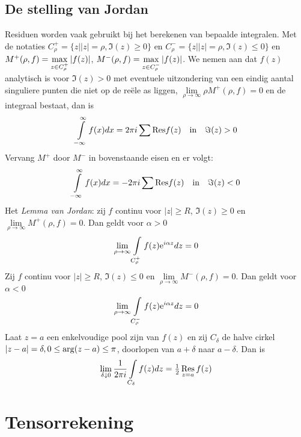 \section{De stelling van Jordan}
Residuen worden vaak gebruikt bij het berekenen van bepaalde integralen. Met de
notaties $C_\rho^+=\{z||z|=\rho,\Im(z)\geq0\}$ en $C_\rho^-=\{z||z|=\rho,\Im(z)\leq0\}$
en $M^+(\rho,f)=\mathop{\rm max}\limits_{z\in C_\rho^+}|f(z)|$,
$M^-(\rho,f)=\mathop{\rm max}\limits_{z\in C_\rho^-}|f(z)|$. We nemen aan dat
$f(z)$ analytisch is voor $\Im(z)>0$ met eventuele uitzondering van een eindig
aantal singuliere punten die niet op de re\"ele as liggen,
$\lim\limits_{\rho\rightarrow\infty}\rho M^+(\rho,f)=0$ en de integraal bestaat,
dan is
\[
\int\limits_{-\infty}^\infty f(x)dx=2\pi i\sum{\rm Res}f(z)~~~\mbox{in}~~~\Im(z)>0
\]
Vervang $M^+$ door $M^-$ in bovenstaande eisen en er volgt:
\[
\int\limits_{-\infty}^\infty f(x)dx=-2\pi i\sum{\rm Res}f(z)~~~\mbox{in}~~~\Im(z)<0
\]
Het {\it Lemma van Jordan}: zij $f$ continu voor $|z|\geq R$, $\Im(z)\geq0$ en
$\lim\limits_{\rho\rightarrow\infty}M^+(\rho,f)=0$. Dan geldt voor $\alpha>0$
\[
\lim_{\rho\rightarrow\infty}\int\limits_{C_\rho^+}f(z){\rm e}^{i\alpha z}dz=0
\]
Zij $f$ continu voor $|z|\geq R$, $\Im(z)\leq0$ en
$\lim\limits_{\rho\rightarrow\infty}M^-(\rho,f)=0$. Dan geldt voor $\alpha<0$
\[
\lim_{\rho\rightarrow\infty}\int\limits_{C_\rho^-}f(z){\rm e}^{i\alpha z}dz=0
\]
Laat $z=a$ een enkelvoudige pool zijn van $f(z)$ en zij $C_\delta$ de halve
cirkel $|z-a|=\delta,0\leq{\rm arg}(z-a)\leq\pi$, doorlopen van $a+\delta$ naar
$a-\delta$. Dan is
\[
\lim_{\delta\downarrow0}\frac{1}{2\pi i}\int\limits_{C_\delta}f(z)dz=\mbox{$\frac{1}{2}$}\mathop{\rm Res}\limits_{z=a}f(z)
\]


\chapter{Tensorrekening}
